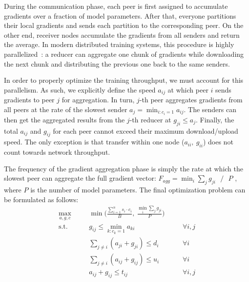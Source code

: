 During the communication phase, each peer is first assigned to accumulate gradients over a fraction of model parameters. After that, everyone partitions their local gradients and sends each partition to the corresponding peer. On the other end, receiver nodes accumulate the gradients from all senders and return the average. In modern distributed training systems, this procedure is highly parallelized~\cite{byteps,pytorch_distributed}: a reducer can aggregate one chunk of gradients while downloading the next chunk and distributing the previous one back to the same senders.

In order to properly optimize the training throughput, we must account for this parallelism. As such, we explicitly define the speed $a_{i j}$ at which peer $i$ sends gradients to peer $j$ for aggregation. In turn, $j$-th peer aggregates gradients from all peers at the rate of the slowest sender $a_j = \min_{i : c_i = 1} a_{i j}$. The senders can then get the aggregated results from the $j$-th reducer at $g_{j i} \leq a_j$. Finally, the total $a_{i j}$ and $g_{i j}$ for each peer cannot exceed their maximum download/upload speed. The only exception is that transfer within one node ($a_{i i}, \ g_{i i}$) does not count towards network throughput.

The frequency of the gradient aggregation phase is simply the rate at which the slowest peer can aggregate the full gradient vector: $F_{agg} = \min_i {\sum_{j} g_{j i}} \text{ } / \text{ }P$ , where $P$ is the number of model parameters. The final optimization problem can be formulated as follows:
\begin{equation}
\label{eq:main_problem}
\begin{array}{rclll}
\underset{a, g, c}{\max} & &
                                \min\Bigg(\frac{\sum_{i=1}^n s_i \cdot c_i }{B},\ 
                                     \frac{ \min_i\sum_{j} g_{j i}}{P}\Bigg)&\quad&\\
\textrm{s.t. } &\quad & g_{i j} \leq \min_{k: c_k{=}1} a_{k i}  &\quad&\forall i, j \\
                 & \quad  & \sum_{j \neq i}\left( a_{j i} + g_{j i}\right) \leq d_{i} & \quad&\forall i \\
                 & \quad &   \sum_{j \neq i}\left( a_{i j} + g_{i j}\right) \leq u_{i} & \quad&\forall i \\
                 & \quad &   a_{i j} + g_{i j} \leq t_{i j} & \quad&\forall i, j \\
\end{array}
\end{equation}


